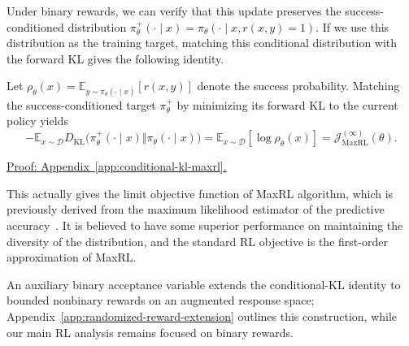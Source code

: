 Under binary rewards, we can verify that this update preserves the success-conditioned distribution
$\pi_\theta^+(\cdot\mid x)
=\pi_\theta(\cdot\mid x,r(x,y)=1)$. If we use this distribution as the training target, matching
this conditional distribution with the forward KL gives the following identity.

\begin{theorem}
\label{lem:conditional-kl-maxrl}
Let $\rho_\theta(x)=\mathbb E_{y\sim\pi_\theta(\cdot\mid x)}[r(x,y)]$
denote the success probability. Matching the success-conditioned target
$\pi_\theta^+$ by minimizing its forward KL to the current policy yields
\begin{equation}
 -\mathbb E_{x\sim\mathcal D}
 D_{\mathrm{KL}}\bigl(\pi_\theta^+(\cdot\mid x)
                  \Vert\pi_\theta(\cdot\mid x)\bigr)
 =\mathbb E_{x\sim\mathcal D}[\log\rho_\theta(x)]
 =\mathcal J_{\mathrm{MaxRL}}^{(\infty)}(\theta).
 \label{eq:conditional-kl-maxrl}
\end{equation}
\end{theorem}
\noindent\hyperref[app:conditional-kl-maxrl]{Proof: Appendix~\ref*{app:conditional-kl-maxrl}.}

This actually gives the limit objective function of MaxRL algorithm, which is previously derived from the maximum likelihood estimator of the predictive accuracy~\citep{tajwar_maximum_2026}. It is believed to have some superior performance on maintaining the diversity of the distribution, and the standard RL objective is the first-order approximation of MaxRL.

An auxiliary binary acceptance variable extends the conditional-KL identity to bounded nonbinary rewards on an augmented response space; Appendix~\ref{app:randomized-reward-extension} outlines this construction, while our main RL analysis remains focused on binary rewards.

